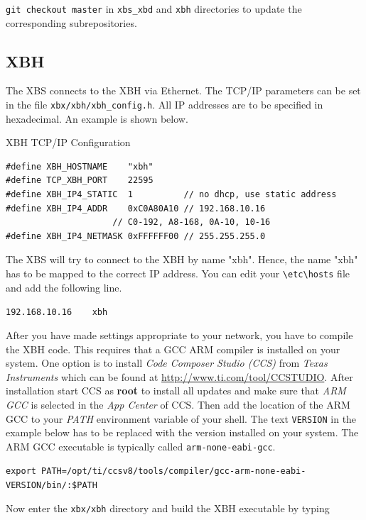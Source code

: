 \documentclass[twoside,11pt]{cergdoc}
\begin{document}
     \verb|git checkout master|
     in \verb|xbs_xbd| and \verb|xbh| directories to update the corresponding
     subrepositories.

    \subsection{XBH}
The XBS connects to the XBH via Ethernet. The TCP/IP parameters can be set
in the file \verb|xbx/xbh/xbh_config.h|. All IP addresses are to be specified
in hexadecimal. An example is shown below.

\begin{cergbox}{XBH TCP/IP Configuration}
\begin{lstlisting}
#define XBH_HOSTNAME    "xbh"
#define TCP_XBH_PORT    22595
#define XBH_IP4_STATIC  1          // no dhcp, use static address
#define XBH_IP4_ADDR    0xC0A80A10 // 192.168.10.16   
                     // C0-192, A8-168, 0A-10, 10-16
#define XBH_IP4_NETMASK 0xFFFFFF00 // 255.255.255.0
\end{lstlisting}
\end{cergbox}

The XBS will try to connect to the XBH by name "xbh". Hence, the name "xbh" has to 
be mapped to the correct IP address. You can edit your \verb|\etc\hosts| file
and add the following line.

\begin{center}
\verb|192.168.10.16    xbh|
\end{center}

After you have made settings appropriate to your network, you have to compile
the XBH code. This requires that a GCC ARM compiler is installed on your system.
One option is to install \emph{Code Composer Studio (CCS)} from \emph{Texas Instruments}
which can be found at \url{http://www.ti.com/tool/CCSTUDIO}. After installation
start CCS as \textbf{root} to install all updates and make sure that 
\emph{ARM GCC} is selected in the \emph{App Center} of CCS. Then add the location
of the ARM GCC to your \emph{PATH} environment variable of your shell. The text 
\texttt{VERSION} in the example below has to be replaced with the version installed
on your system. 
The ARM GCC executable is typically called \texttt{arm-none-eabi-gcc}.

\begin{center}
\lstinline|export PATH=/opt/ti/ccsv8/tools/compiler/gcc-arm-none-eabi-VERSION/bin/:$PATH| 
\end{center}

Now enter the \verb|xbx/xbh| directory and build the XBH executable by typing 
\end{document}
